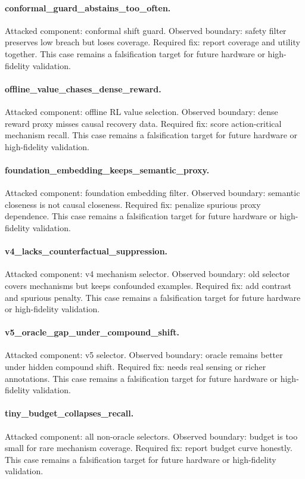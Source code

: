 \documentclass{article}
\begin{document}
\paragraph{conformal\_guard\_abstains\_too\_often.} Attacked component: conformal shift guard. Observed boundary: safety filter preserves low breach but loses coverage. Required fix: report coverage and utility together. This case remains a falsification target for future hardware or high-fidelity validation.
\paragraph{offline\_value\_chases\_dense\_reward.} Attacked component: offline RL value selection. Observed boundary: dense reward proxy misses causal recovery data. Required fix: score action-critical mechanism recall. This case remains a falsification target for future hardware or high-fidelity validation.
\paragraph{foundation\_embedding\_keeps\_semantic\_proxy.} Attacked component: foundation embedding filter. Observed boundary: semantic closeness is not causal closeness. Required fix: penalize spurious proxy dependence. This case remains a falsification target for future hardware or high-fidelity validation.
\paragraph{v4\_lacks\_counterfactual\_suppression.} Attacked component: v4 mechanism selector. Observed boundary: old selector covers mechanisms but keeps confounded examples. Required fix: add contrast and spurious penalty. This case remains a falsification target for future hardware or high-fidelity validation.
\paragraph{v5\_oracle\_gap\_under\_compound\_shift.} Attacked component: v5 selector. Observed boundary: oracle remains better under hidden compound shift. Required fix: needs real sensing or richer annotations. This case remains a falsification target for future hardware or high-fidelity validation.
\paragraph{tiny\_budget\_collapses\_recall.} Attacked component: all non-oracle selectors. Observed boundary: budget is too small for rare mechanism coverage. Required fix: report budget curve honestly. This case remains a falsification target for future hardware or high-fidelity validation.
\end{document}
